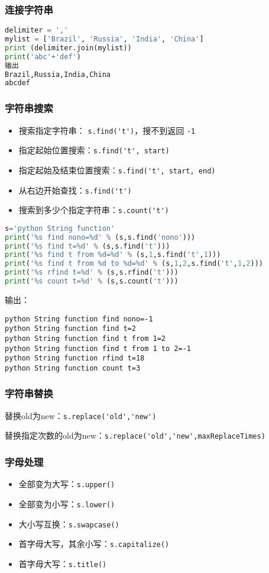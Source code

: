 \subsubsection{连接字符串}
\begin{lstlisting}[language=python]
delimiter = ','
mylist = ['Brazil', 'Russia', 'India', 'China']
print (delimiter.join(mylist))
print('abc'+'def')
输出
Brazil,Russia,India,China
abcdef
\end{lstlisting}

\subsubsection{字符串搜索}
\begin{itemize}
\item 搜索指定字符串： \verb|s.find('t')|，搜不到返回 \verb|-1|
\item 指定起始位置搜索：\verb|s.find('t', start)|
\item 指定起始及结束位置搜索：\verb|s.find('t', start, end)|
\item 从右边开始查找：\verb|s.find('t')|
\item 搜索到多少个指定字符串：\verb|s.count('t')|
\end{itemize}

\begin{lstlisting}[language=python]
s='python String function'
print('%s find nono=%d' % (s,s.find('nono')))
print('%s find t=%d' % (s,s.find('t')))
print('%s find t from %d=%d' % (s,1,s.find('t',1)))
print('%s find t from %d to %d=%d' % (s,1,2,s.find('t',1,2)))
print('%s rfind t=%d' % (s,s.rfind('t')))
print('%s count t=%d' % (s,s.count('t')))
\end{lstlisting}
输出：
\begin{lstlisting}
python String function find nono=-1
python String function find t=2
python String function find t from 1=2
python String function find t from 1 to 2=-1
python String function rfind t=18
python String function count t=3
\end{lstlisting}

\subsubsection{字符串替换}

替换old为new：\verb|s.replace('old','new')|

替换指定次数的old为new：\verb|s.replace('old','new',maxReplaceTimes)|


\subsubsection{字母处理}
\begin{itemize}
\item 全部变为大写：\verb|s.upper()|
\item 全部变为小写：\verb|s.lower()|
\item 大小写互换：\verb|s.swapcase()|
\item 首字母大写，其余小写：\verb|s.capitalize()|
\item 首字母大写：\verb|s.title()|
\end{itemize}


